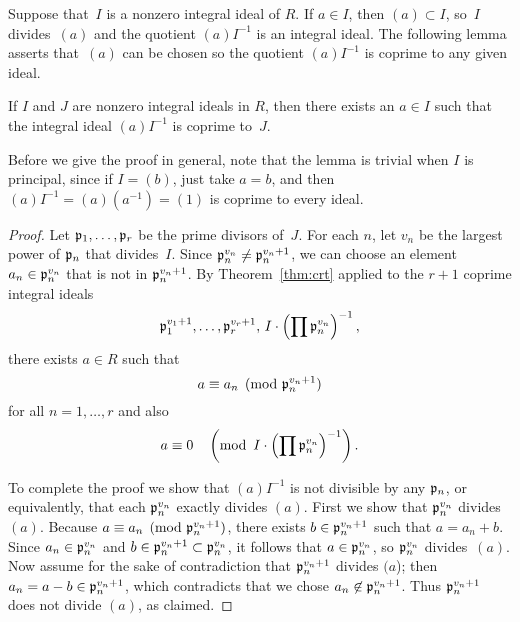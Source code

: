 Suppose that~$I$ is a nonzero integral ideal of
$R$.  If $a\in I$, then $(a)\subset I$, so~$I$ divides~$(a)$ and
the quotient $(a)I^{-1}$ is an integral ideal.  The following lemma
asserts that~$(a)$ can be chosen so the quotient $(a)I^{-1}$ is coprime to
any given ideal.
\begin{lemma}\label{lem:magica}
If $I$ and $J$ are nonzero integral ideals in $R$, then there exists
an $a\in I$ such that the integral ideal $(a)I^{-1}$ is coprime to~$J$.
\end{lemma}
Before we give the proof in general, note that the lemma is trivial
when $I$ is principal, since if $I=(b)$, just take $a=b$, and 
then $(a)I^{-1} = (a)(a^{-1})= (1)$ is coprime to every ideal.
\begin{proof}
Let $\mathfrak{p}_1,\ldots, \mathfrak{p}_r$ be the prime divisors of~$J$.
For each $n$, let $v_n$ be the largest power of $\mathfrak{p}_n$
that divides~$I$.  
Since $\mathfrak{p}_n^{v_n}\neq \mathfrak{p}_n^{v_n+1}$, 
we can choose an element $a_n\in \mathfrak{p}_n^{v_n}$
that is not in $\mathfrak{p}_n^{v_n+1}$.
By Theorem~\ref{thm:crt} applied to
the $r+1$ coprime integral ideals
$$
  \mathfrak{p}_1^{v_1+1}, \ldots, \mathfrak{p}_r^{v_r+1}, \, I\cdot \left(\prod \mathfrak{p}_n^{v_n}\right)^{-1},
$$
there exists $a\in R$
such that
$$
   a \equiv a_n \pmod{\mathfrak{p}_n^{v_n+1}}
$$
for all $n=1,\ldots, r$ and
also 
$$
   a \equiv 0 \quad \left(\text{mod}\,\,\, I\cdot \left(\prod \mathfrak{p}_n^{v_n}\right)^{-1}\right).
$$

To complete the proof we show that $(a)I^{-1}$ is not
divisible by any $\mathfrak{p}_n$, or equivalently, that each 
$\mathfrak{p}_n^{v_n}$ exactly divides $(a)$. 
First we show that $\mathfrak{p}_n^{v_n}$ divides $(a)$. Because
$a\equiv a_n \pmod{\mathfrak{p}_n^{v_n+1}}$, there exists 
$b \in \mathfrak{p}_n^{v_n+1}$ such that $a = a_n + b$.  Since
$a_n\in \mathfrak{p}_n^{v_n}$ and $b \in \mathfrak{p}_n^{v_n + 1} \subset \mathfrak{p}_n^{v_n}$, 
it follows that $a\in \mathfrak{p}_n^{v_n}$,
so $\mathfrak{p}_n^{v_n}$ divides~$(a)$.  
Now assume for the sake of contradiction that
$\mathfrak{p}_n^{v_n+1}$ divides $(a$); then $a_n=a-b\in \mathfrak{p}_n^{v_n+1}$, which
contradicts that we chose $a_n \not\in\mathfrak{p}_n^{v_n+1}$.
Thus
$\mathfrak{p}_n^{v_n+1}$ does not divide $(a)$, as claimed. 
\end{proof}



